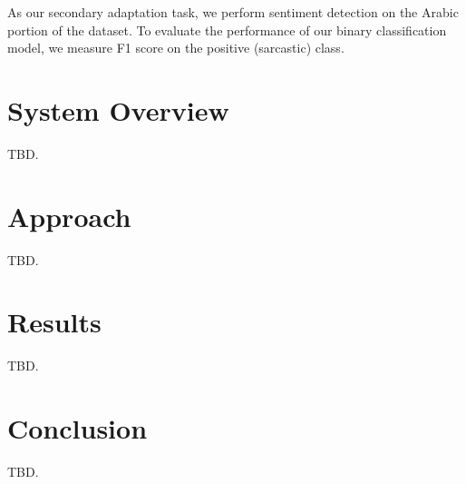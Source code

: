\documentclass[11pt]{article}
\begin{document}
As our secondary adaptation task, we perform sentiment detection on the Arabic portion of the dataset. To evaluate the performance of our binary classification model, we measure F1 score on the positive (sarcastic) class.

\section{System Overview}

TBD.

\section{Approach}

TBD.

\section{Results}

TBD.

\section{Conclusion}

TBD.




\appendix
\end{document}
